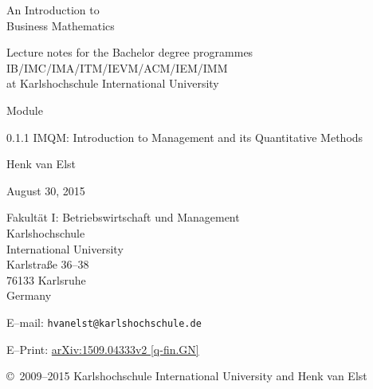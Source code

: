 \documentclass[a4paper,12pt]{book}
\begin{document}

\vspace*{1cm}
\begin{center}
{\Huge\sc
										An Introduction to \\
                    Business Mathematics
\par}
\par\vfill\vfill
                           Lecture notes for
                           the Bachelor degree programmes \\ 
							IB/IMC/IMA/ITM/IEVM/ACM/IEM/IMM \\%
							at Karlshochschule International University
\par\vfill
							Module
\par\vfill
							0.1.1 IMQM: Introduction to Management and its
							Quantitative Methods
\par\vfill\vfill\vfill

                    {\large\sc Henk van Elst}

\par\vfill

                 August 30, 2015
\par\vfill\vfill

                 Fakult\"at I: Betriebswirtschaft und Management\\
                 Karlshochschule\\
                 International University\\
                 Karlstra\ss e 36--38\\
                 76133 Karlsruhe\\
                 Germany
\par\vfill
                 E--mail: {\tt hvanelst@karlshochschule.de}
\par\vfill\vfill
                 E--Print: 
\href{http://arxiv.org/abs/1509.04333}{arXiv:1509.04333v2 
[q-fin.GN]}
\par\vfill\vfill\vfill
									\copyright\ 2009--2015 Karlshochschule
									International University
									and Henk van Elst
                    
\end{center}
\vspace*{1cm}
\sloppy
      \renewcommand{\thepage}{}                 %
      
      \newpage \thispagestyle{empty}
      \setcounter{page}{1}
\tableofcontents
      \newpage \thispagestyle{empty}
      \cleardoublepage {}













\end{document}
